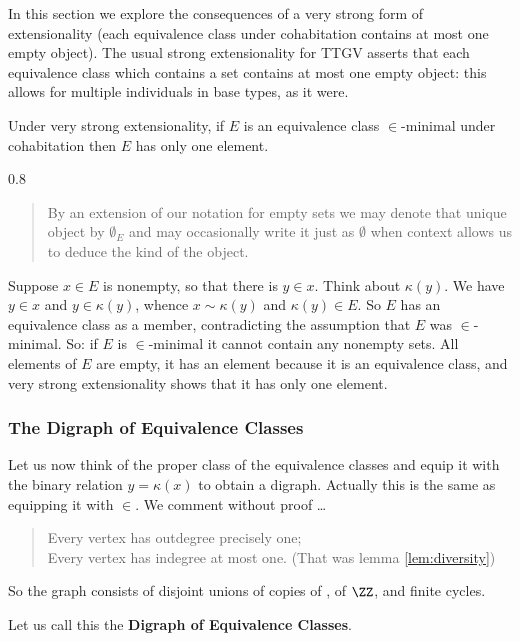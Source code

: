 \documentclass[12pt]{article}
\renewcommand{\smallpara}[1]{\begin{footnotesize}\begin{spacing}{0.8}\begin{quote} #1  \end{quote}\end{spacing}\end{footnotesize}}
\begin{document}
{\medskip
In this section we explore the consequences of a very strong form of extensionality (each equivalence class under cohabitation contains at most one empty object).
The usual strong extensionality for TTGV asserts that each equivalence class which contains a set contains at most one empty object:  this allows for multiple individuals in base types, as it were.

\begin{rem}\label{rem:minimal}  Under very strong extensionality,
  if $E$ is an 
  equivalence class $\in$-minimal under cohabitation then $E$ has only one element.\end{rem}

  \smallpara{By an extension of our notation for empty sets we may denote that unique object by $\emptyset_E$ and may occasionally write it just as $\emptyset$ when context allows us to deduce the kind of the object.}


\Proof

Suppose $x \in E$ is nonempty, so that there is $y \in x$. Think about
$\kappa(y)$.  We have $y \in x$ and $y \in \kappa(y)$, whence $x \sim \kappa(y)$ 
and $\kappa(y) \in E$. So $E$ has an equivalence class as a member, 
contradicting the assumption that $E$ was $\in$-minimal.  So: if $E$ is 
$\in$-minimal it cannot contain any nonempty sets.   All elements of $E$ are empty, it has an element because it is an equivalence class, and very strong extensionality shows that it has only one element.\endproof

\subsubsection*{The Digraph of Equivalence Classes}


Let us now think of the proper class of the equivalence classes and
equip it with the binary relation $y = \kappa(x)$ to obtain a digraph.
Actually this is the same as equipping it with $\in$.   We comment without proof \ldots
\begin{quote}
Every vertex has outdegree precisely one;\\
Every vertex has indegree at most one. (That was lemma \ref{lem:diversity})
\end{quote}
So the graph consists of disjoint unions of copies of \Nn, of $\ZZ$,
and finite cycles.


\medskip

Let us call this the {\bf Digraph of Equivalence Classes}.

\medskip

}
\end{document}
